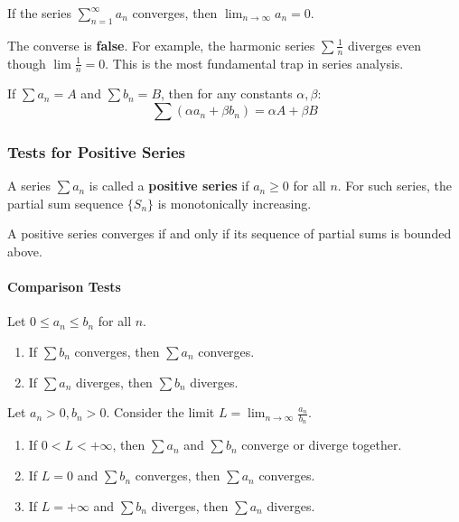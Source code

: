 \begin{theorem}
If the series $\sum_{n=1}^{\infty} a_n$ converges, then $\lim_{n \to \infty} a_n = 0$.
\end{theorem}

The converse is \textbf{false}. For example, the harmonic series $\sum \frac{1}{n}$ diverges even though $\lim \frac{1}{n} = 0$. This is the most fundamental trap in series analysis.


\begin{property}[Linearity]
If $\sum a_n = A$ and $\sum b_n = B$, then for any constants $\alpha, \beta$:
\[ \sum (\alpha a_n + \beta b_n) = \alpha A + \beta B \]
\end{property}

\subsubsection{Tests for Positive Series}

A series $\sum a_n$ is called a \textbf{positive series} if $a_n \ge 0$ for all $n$.
For such series, the partial sum sequence $\{S_n\}$ is monotonically increasing.
\begin{theorem}
A positive series converges if and only if its sequence of partial sums is bounded above.
\end{theorem}

\paragraph{Comparison Tests}
\begin{theorem}
Let $0 \le a_n \le b_n$ for all $n$.
\begin{enumerate}
    \item If $\sum b_n$ converges, then $\sum a_n$ converges.
    \item If $\sum a_n$ diverges, then $\sum b_n$ diverges.
\end{enumerate}
\end{theorem}

\begin{theorem}
Let $a_n > 0, b_n > 0$. Consider the limit $L = \lim_{n \to \infty} \frac{a_n}{b_n}$.
\begin{enumerate}
    \item If $0 < L < +\infty$, then $\sum a_n$ and $\sum b_n$ converge or diverge together.
    \item If $L = 0$ and $\sum b_n$ converges, then $\sum a_n$ converges.
    \item If $L = +\infty$ and $\sum b_n$ diverges, then $\sum a_n$ diverges.
\end{enumerate}
\end{theorem}


